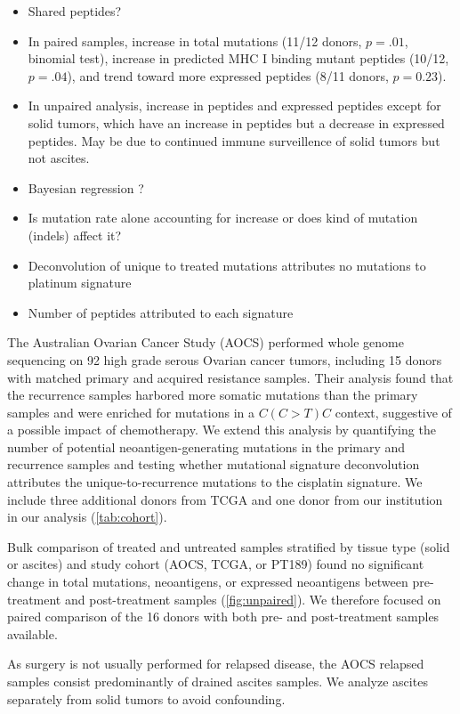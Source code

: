 \begin{itemize}
\item Shared peptides?
\item In paired samples, increase in total mutations (11/12 donors, $p=.01$, binomial test), increase in predicted MHC I binding mutant peptides (10/12, $p=.04$), and trend toward more expressed peptides (8/11 donors, $p=0.23$). 
\item In unpaired analysis, increase in peptides and expressed peptides except for solid tumors, which have an increase in peptides but a decrease in expressed peptides. May be due to continued immune surveillence of solid tumors but not ascites.
\item Bayesian regression ?
\item Is mutation rate alone accounting for increase or does kind of mutation (indels) affect it?
\item Deconvolution of unique to treated mutations attributes no mutations to platinum signature
\item Number of peptides attributed to each signature
\end{itemize}

The Australian Ovarian Cancer Study (AOCS)\cite{Patch_2015} performed whole genome sequencing on 92 high grade serous Ovarian cancer tumors, including 15 donors with matched primary and acquired resistance samples. Their analysis found that the recurrence samples harbored more somatic mutations than the primary samples and were enriched for mutations in a $C(C \gt T)C$ context, suggestive of a possible impact of chemotherapy. We extend this analysis by quantifying the number of potential neoantigen-generating mutations in the primary and recurrence samples and testing whether mutational signature deconvolution attributes the unique-to-recurrence mutations to the  cisplatin signature. We include three additional donors from TCGA and one donor from our institution in our analysis (\ref{tab:cohort}).

Bulk comparison of treated and untreated samples stratified by tissue type (solid or ascites) and study cohort (AOCS, TCGA, or PT189) found no significant change in total mutations, neoantigens, or expressed neoantigens between pre-treatment and post-treatment samples (\ref{fig:unpaired}). We therefore focused on paired comparison of the 16 donors with both pre- and post-treatment samples available. 

As surgery is not usually performed for relapsed disease, the AOCS relapsed samples consist predominantly of drained ascites samples. We analyze ascites separately from solid tumors to avoid confounding. 


